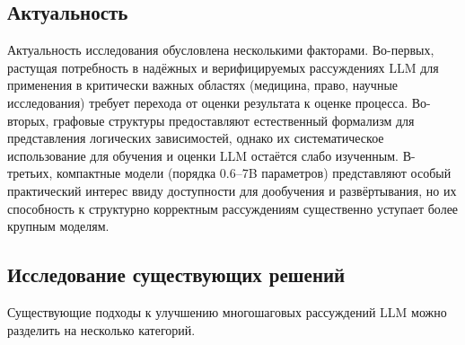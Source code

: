 \subsection{Актуальность}
\label{subsec:relevance}

Актуальность исследования обусловлена несколькими факторами. Во-первых, растущая потребность в надёжных и верифицируемых рассуждениях LLM для применения в критически важных областях (медицина, право, научные исследования) требует перехода от оценки результата к оценке процесса. Во-вторых, графовые структуры предоставляют естественный формализм для представления логических зависимостей, однако их систематическое использование для обучения и оценки LLM остаётся слабо изученным. В-третьих, компактные модели (порядка 0.6--7B параметров) представляют особый практический интерес ввиду доступности для дообучения и развёртывания, но их способность к структурно корректным рассуждениям существенно уступает более крупным моделям.

\subsection{Исследование существующих решений}
\label{subsec:existing-solutions}

Существующие подходы к улучшению многошаговых рассуждений LLM можно разделить на несколько категорий.

